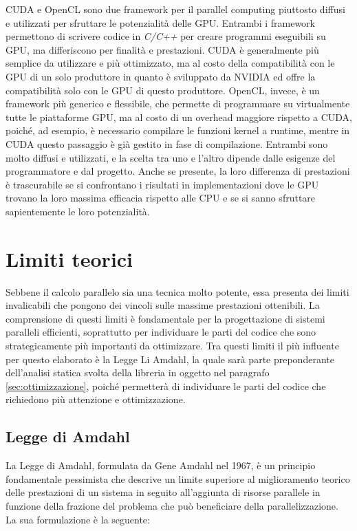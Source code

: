 CUDA e OpenCL sono due framework per il parallel computing piuttosto diffusi e
utilizzati per sfruttare le potenzialità delle GPU. Entrambi i framework permettono
di scrivere codice in \textit{C/C++} per creare programmi eseguibili su GPU, ma differiscono
per finalità e prestazioni. CUDA è generalmente più semplice da utilizzare e più
ottimizzato, ma al costo della compatibilità con le GPU di un solo produttore in
quanto è sviluppato da NVIDIA ed offre la compatibilità solo con le GPU di questo
produttore. OpenCL, invece, è un framework più generico e flessibile, che permette
di programmare su virtualmente tutte le piattaforme GPU, ma al costo di un
overhead maggiore rispetto a CUDA, poiché, ad esempio, è necessario compilare le
funzioni kernel a runtime, mentre in CUDA questo passaggio è già gestito in fase
di compilazione. Entrambi sono molto diffusi e utilizzati, e la scelta tra uno e
l'altro dipende dalle esigenze del programmatore e dal progetto. Anche se presente,
la loro differenza di prestazioni è trascurabile se si confrontano i risultati
in implementazioni dove le GPU trovano la loro massima efficacia rispetto alle
CPU e se si sanno sfruttare sapientemente le loro potenzialità.

\section{Limiti teorici}
\label{sec:limititeorici}

Sebbene il calcolo parallelo sia una tecnica molto potente, essa presenta dei
limiti invalicabili che pongono dei vincoli sulle massime prestazioni ottenibili.
La comprensione di questi limiti è fondamentale per la progettazione di sistemi paralleli
efficienti, soprattutto per individuare le parti del codice che sono
strategicamente più importanti da ottimizzare. Tra questi limiti il più influente
per questo elaborato è la Legge Li Amdahl, la quale sarà parte preponderante
dell'analisi statica svolta della libreria in oggetto nel paragrafo
\ref{sec:ottimizzazione}, poiché permetterà di individuare le parti del codice che
richiedono più attenzione e ottimizzazione.

\subsection{Legge di Amdahl}
\label{sec:amdahl}

La Legge di Amdahl, formulata da Gene Amdahl nel 1967, è un principio
fondamentale pessimista che descrive un limite superiore al miglioramento
teorico delle prestazioni di un sistema in seguito all'aggiunta di risorse
parallele in funzione della frazione del problema che può beneficiare della
parallelizzazione. La sua formulazione è la seguente:

